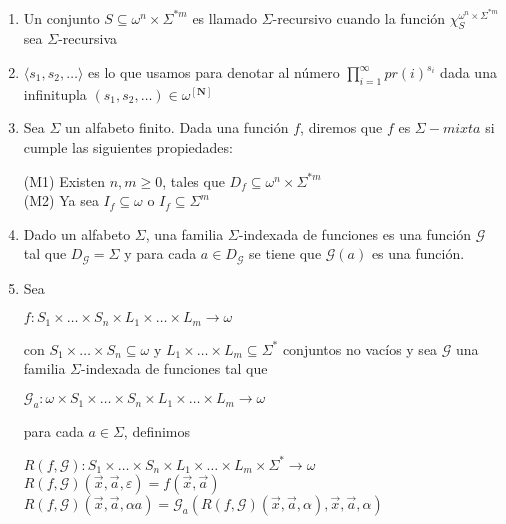 \documentclass{article}
\begin{document}
\begin{enumerate}
    \item Un conjunto $S \subseteq \omega^n \times \Sigma^{*m}$ 
    es llamado $\Sigma$-recursivo cuando la función $\chi_{S}^{\omega^n \times \Sigma^{*m}}$
    sea $\Sigma$-recursiva
    \item $\langle s_1, s_2, \dots \rangle$ es lo que usamos para denotar al número
    $\displaystyle \prod_{i=1}^{\infty} pr(i)^{s_i}$ dada una infinitupla 
    $(s_1, s_2, \dots) \in \omega^{[\mathbf{N}]}$
    \item Sea $\Sigma$ un alfabeto finito. Dada una función $f$, diremos que $f$ es 
    $\Sigma-mixta$ si cumple las siguientes propiedades:
    
        (M1) Existen $n, m \geq 0$, tales que $D_f \subseteq \omega^n \times \Sigma^{*m}$\\
        (M2) Ya sea $I_f \subseteq \omega$ o $I_f \subseteq \Sigma^{m}$
    
    \item Dado un alfabeto $\Sigma$, una familia $\Sigma$-indexada de funciones es una función $\mathcal{G}$ tal que $D_{\mathcal{G}} = \Sigma$ y para cada
    $a \in D_{\mathcal{G}}$ se tiene que $\mathcal{G}(a)$ es una función.
    \item Sea
    \begin{center}
        $f : S_1 \times \dots \times S_n \times L_1 \times \dots \times L_m \rightarrow \omega$ 
    \end{center}
    con $S_1 \times \dots \times S_n \subseteq \omega$ y $L_1 \times \dots \times L_m \subseteq \Sigma^{*}$
    conjuntos no vacíos y sea $\mathcal{G}$ una familia $\Sigma$-indexada de funciones
    tal que 
    \begin{center}
        $\mathcal{G}_a : \omega \times S_1 \times \dots \times S_n \times L_1 \times \dots \times L_m \rightarrow \omega$
    \end{center}
    para cada $a \in \Sigma$, definimos
    \begin{center}
        $R(f, \mathcal{G}) : S_1 \times \dots \times S_n \times L_1 \times \dots \times L_m 
        \times \Sigma^{*} \rightarrow \omega$ \\
        $R(f, \mathcal{G}) (\overset{\rightarrow}{x}, \overset{\rightarrow}{a}, \varepsilon) = 
        f(\overset{\rightarrow}{x}, \overset{\rightarrow}{a})$ \\
        $R(f, \mathcal{G}) (\overset{\rightarrow}{x}, \overset{\rightarrow}{a}, \alpha a) = 
        \mathcal{G}_a(R(f, \mathcal{G}) (\overset{\rightarrow}{x}, \overset{\rightarrow}{a}, \alpha), 
        \overset{\rightarrow}{x}, \overset{\rightarrow}{a}, \alpha)$
    \end{center}
\end{enumerate}
\end{document}
